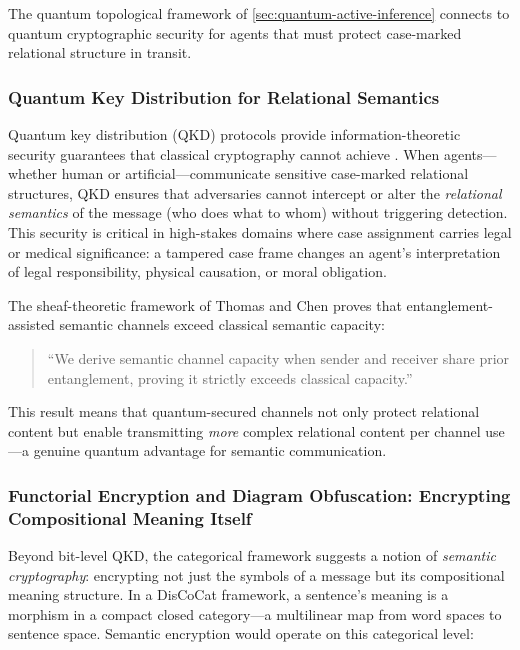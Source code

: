 \documentclass[
]{article}
\begin{document}
The quantum topological framework of
\autoref{sec:quantum-active-inference} connects to quantum cryptographic
security for agents that must protect case-marked relational structure
in transit.

\subsubsection{Quantum Key Distribution for Relational
Semantics}\label{quantum-key-distribution-for-relational-semantics}

Quantum key distribution (QKD) protocols provide information-theoretic
security guarantees that classical cryptography cannot achieve
\citep{pirandola2020qkd}. When agents---whether human or
artificial---communicate sensitive case-marked relational structures,
QKD ensures that adversaries cannot intercept or alter the
\emph{relational semantics} of the message (who does what to whom)
without triggering detection. This security is critical in high-stakes
domains where case assignment carries legal or medical significance: a
tampered case frame changes an agent's interpretation of legal
responsibility, physical causation, or moral obligation.

The sheaf-theoretic framework of Thomas and Chen
\citeyearpar{thomas2025quantum} proves that entanglement-assisted
semantic channels exceed classical semantic capacity:

\begin{quote}
``We derive semantic channel capacity when sender and receiver share
prior entanglement, proving it strictly exceeds classical capacity.''
\citep{thomas2025quantum}
\end{quote}

This result means that quantum-secured channels not only protect
relational content but enable transmitting \emph{more} complex
relational content per channel use---a genuine quantum advantage for
semantic communication.

\subsubsection{Functorial Encryption and Diagram Obfuscation: Encrypting
Compositional Meaning
Itself}\label{functorial-encryption-and-diagram-obfuscation-encrypting-compositional-meaning-itself}

Beyond bit-level QKD, the categorical framework suggests a notion of
\emph{semantic cryptography}: encrypting not just the symbols of a
message but its compositional meaning structure. In a DisCoCat
framework, a sentence's meaning is a morphism in a compact closed
category---a multilinear map from word spaces to sentence space.
Semantic encryption would operate on this categorical level:
\end{document}
